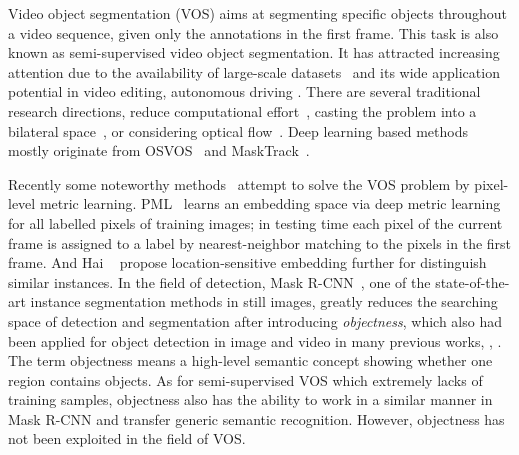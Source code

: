 \documentclass[10pt,twocolumn,letterpaper]{article}
\begin{document}
Video object segmentation (VOS) aims at segmenting specific objects throughout a video sequence, given only the annotations in the first frame. This task is also known as semi-supervised video object segmentation. It has attracted increasing attention due to the availability of large-scale datasets~\cite{davis17_arxiv, yvos_eccv18} and its wide application potential in video editing, autonomous driving \etc. There are several traditional research directions, \eg reduce computational effort~\cite{temporal_superpixels_vos_cvpr13, seamseg_vos_cvpr14, fully_connected_vos_iccv15}, casting the problem into a bilateral space~\cite{bilateral_space_vos_cvpr16}, or considering optical flow~\cite{graph_based_vos_cvpr10, seamseg_vos_cvpr14}. Deep learning based methods mostly originate from OSVOS~\cite{osvos_cvpr17} and MaskTrack~\cite{masktrack_cvpr17}.









Recently some noteworthy methods~\cite{pml_cvpr18, vos_by_lse_eccv18} attempt to solve the VOS problem by pixel-level metric learning. PML~\cite{pml_cvpr18} learns an embedding space via deep metric learning for all labelled pixels of training images; in testing time each pixel of the current frame is assigned to a label by nearest-neighbor matching to the pixels in the first frame. And Hai \etal~\cite{vos_by_lse_eccv18} propose location-sensitive embedding further for distinguish similar instances. In the field of detection, Mask R-CNN~\cite{mask_rcnn_iccv17}, one of the state-of-the-art instance segmentation methods in still images, greatly reduces the searching space of detection and segmentation after introducing \textit{objectness}, which also had been applied for object detection in image and video in many previous works, \eg, \cite{faster_rcnn_iccv15, video_det_tubelet_proposal_cvpr17}. The term objectness means a high-level semantic concept showing whether one region contains objects. As for semi-supervised VOS which extremely lacks of training samples, objectness also has the ability to work in a similar manner in Mask R-CNN and transfer generic semantic recognition. However, objectness has not been exploited in the field of VOS.
\end{document}
